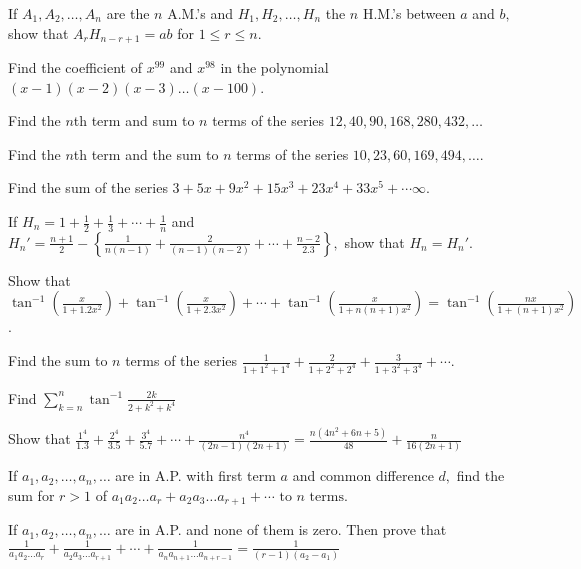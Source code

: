 \item If $A_1, A_2, \ldots, A_n$ are the $n$ A.M.'s and $H_1, H_2, \ldots, H_n$ the $n$ H.M.'s between $a$ and $b,$ show
  that $A_rH_{n - r + 1} = ab$ for $1\leq r\leq n$.
\item Find the coefficient of $x^{99}$ and $x^{98}$ in the polynomial $(x - 1)(x - 2)(x - 3)\ldots(x - 100)$.
\item Find the $n$th term and sum to $n$ terms of the series $12, 40, 90, 168, 280, 432, \ldots$
\item Find the $n$th term and the sum to $n$ terms of the series $10, 23, 60, 169, 494, \ldots$.
\item Find the sum of the series $3 + 5x + 9x^2 + 15x^3 + 23x^4 + 33x^5 + \cdots \infty$.
\item If $H_n = 1 + \frac{1}{2} + \frac{1}{3} + \cdots + \frac{1}{n}$ and $H_n' = \frac{n + 1}{2} - \left\{\frac{1}{n(n - 1)}
  + \frac{2}{(n - 1)(n - 2)} + \cdots + \frac{n - 2}{2.3}\right\},$ show that $H_n = H_n'$.
\item Show that $\tan^{-1}\left(\frac{x}{1 + 1.2x^2}\right) + \tan^{-1}\left(\frac{x}{1 + 2.3x^2}\right) + \cdots+
  \tan^{-1}\left(\frac{x}{1 + n(n + 1)x^2}\right) = \tan^{-1}\left(\frac{nx}{1 + (n + 1)x^2}\right)$.
\item Find the sum to $n$ terms of the series $\frac{1}{1 + 1^2 + 1^4} + \frac{2}{1 + 2^2 + 2^4} + \frac{3}{1 + 3^2 +
  3^4} + \cdots$.
\item Find $\displaystyle\sum_{k=n}^n\tan^{-1}\frac{2k}{2 + k^2 + k^4}$
\item Show that $\frac{1^4}{1.3} + \frac{2^4}{3.5} + \frac{3^4}{5.7} + \cdots + \frac{n^4}{(2n - 1)(2n + 1)} =
  \frac{n(4n^2 + 6n + 5)}{48} + \frac{n}{16(2n + 1)}$
\item If $a_1, a_2, \ldots, a_n, \ldots$ are in A.P. with first term $a$ and common difference $d,$ find the sum for $r >
  1$ of $a_1a_2\ldots a_r + a_2a_3\ldots a_{r + 1} + \cdots \text{~to~}n\text{~terms}$.
\item If $a_1, a_2, \ldots, a_n, \ldots$ are in A.P. and none of them is zero. Then prove that $\frac{1}{a_1a_2\ldots
    a_r} + \frac{1}{a_2a_3\ldots a_{r + 1}} + \cdots + \frac{1}{a_na_{n + 1}\ldots a_{n + r - 1}} = \frac{1}{(r - 1)(a_2 -
  a_1)}$

